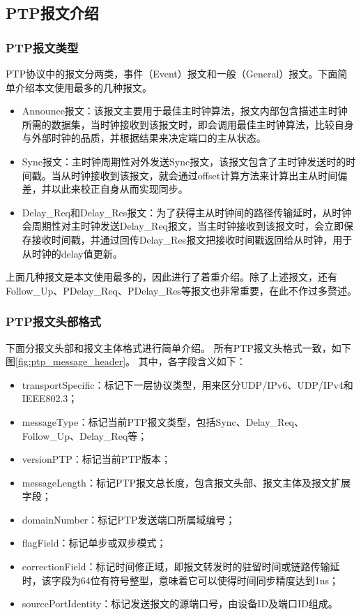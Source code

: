 \subsection{PTP报文介绍}
\subsubsection{PTP报文类型}
PTP协议中的报文分两类，事件（Event）报文和一般（General）报文。下面简单介绍本文使用最多的几种报文。
\begin{itemize}[noitemsep,topsep=0pt,parsep=0pt,partopsep=0pt]
	\item Announce报文：该报文主要用于最佳主时钟算法，报文内部包含描述主时钟所需的数据集，当时钟接收到该报文时，即会调用最佳主时钟算法，比较自身与外部时钟的品质，并根据结果来决定端口的主从状态。
	\item Sync报文：主时钟周期性对外发送Sync报文，该报文包含了主时钟发送时的时间戳。当从时钟接收到该报文，就会通过offset计算方法来计算出主从时间偏差，并以此来校正自身从而实现同步。
	\item Delay\_Req和Delay\_Res报文：为了获得主从时钟间的路径传输延时，从时钟会周期性对主时钟发送Delay\_Req报文，当主时钟接收到该报文时，会立即保存接收时间戳，并通过回传Delay\_Res报文把接收时间戳返回给从时钟，用于从时钟的delay值更新。
\end{itemize}
上面几种报文是本文使用最多的，因此进行了着重介绍。除了上述报文，还有Follow\_Up、PDelay\_Req、PDelay\_Res等报文也非常重要，在此不作过多赘述。

\subsubsection{PTP报文头部格式}
下面分报文头部和报文主体格式进行简单介绍。
所有PTP报文头格式一致，如下图\ref{fig:ptp_message_header}。
其中，各字段含义如下：
\begin{itemize}[noitemsep,topsep=0pt,parsep=0pt,partopsep=0pt]
	\item transportSpecific：标记下一层协议类型，用来区分UDP/IPv6、UDP/IPv4和IEEE802.3；
	\item messageType：标记当前PTP报文类型，包括Sync、Delay\_Req、Follow\_Up、Delay\_Req等；
	\item versionPTP：标记当前PTP版本；
	\item messageLength：标记PTP报文总长度，包含报文头部、报文主体及报文扩展字段；
	\item domainNumber：标记PTP发送端口所属域编号；
	\item flagField：标记单步或双步模式；
	\item correctionField：标记时间修正域，即报文转发时的驻留时间或链路传输延时，该字段为64位有符号整型，意味着它可以使得时间同步精度达到1ns；
	\item sourcePortIdentity：标记发送报文的源端口号，由设备ID及端口ID组成。
\end{itemize}

